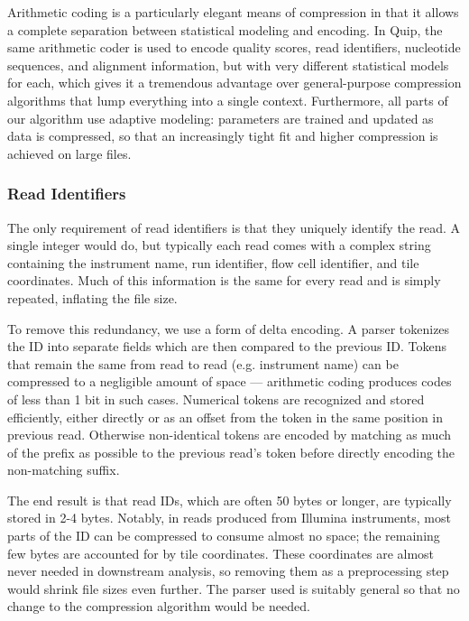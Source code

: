 \documentclass[a4,center,fleqn]{NAR}
\begin{document}
Arithmetic coding is a particularly elegant means of compression in that it
allows a complete separation between statistical modeling and encoding. In
Quip, the same arithmetic coder is used to encode quality scores, read
identifiers, nucleotide sequences, and alignment information, but with very
different statistical models for each, which gives it a tremendous advantage
over general-purpose compression algorithms that lump everything into a
single context. Furthermore, all parts of our algorithm use adaptive modeling:
parameters are trained and updated as data is compressed, so that an
increasingly tight fit and higher compression is achieved on large files.


\subsubsection{Read Identifiers}

The only requirement of read identifiers is that they uniquely identify the
read. A single integer would do, but typically each read comes with a complex
string containing the instrument name, run identifier, flow cell identifier,
and tile coordinates. Much of this information is the same for every read and
is simply repeated, inflating the file size.

To remove this redundancy, we use a form of delta encoding. A  parser
tokenizes the ID into separate fields which are then compared to the previous
ID. Tokens that remain the same from read to read (e.g. instrument name)
can be compressed to a negligible amount of space --- arithmetic coding produces
codes of less than 1 bit in such cases. Numerical tokens are recognized and
stored efficiently, either directly or as an offset from the token in the same
position in previous read. Otherwise non-identical tokens are encoded by
matching as much of the prefix as possible to the previous read's token before
directly encoding the non-matching suffix.

The end result is that read IDs, which are often 50 bytes or longer, are
typically stored in 2-4 bytes. Notably, in reads produced from Illumina
instruments, most parts of the ID can be compressed to consume almost no
space; the remaining few bytes are accounted for by tile coordinates. These
coordinates are almost never needed in downstream analysis, so removing them
as a preprocessing step would shrink file sizes even further. The parser used
is suitably general so that no change to the compression algorithm would be
needed.
\end{document}
